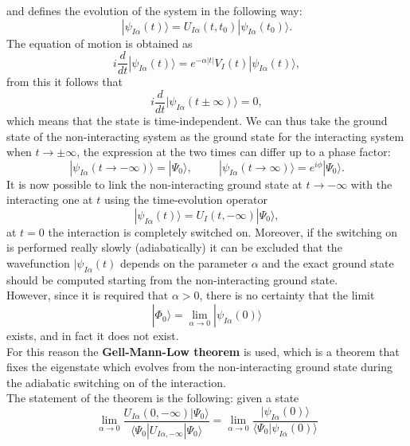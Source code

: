 \documentclass[12pt, a4paper]{report}
\numberwithin{equation}{section}
\begin{document}
and defines the evolution of the system in the following way:
\begin{equation}
    |\psi_{I\alpha}(t)\rangle=U_{I\alpha}(t,t_0)|\psi_{I\alpha}(t_0)\rangle.
\end{equation}
The equation of motion is obtained as
\begin{equation}
    i\frac{d}{dt}|\psi_{I\alpha}(t)\rangle = e^{-\alpha |t|} V_I(t)|\psi_{I\alpha}(t)\rangle,
\end{equation}
from this it follows that 
\begin{equation}
    i\frac{d}{dt}|\psi_{I\alpha}(t\pm\infty)\rangle = 0,
\end{equation}
which means that the state is time-independent. We can thus take the ground state of the non-interacting system as the ground state for the 
interacting system when $t\to\pm\infty$, the expression at the two times can differ up to a phase factor:
\begin{equation}
    |\psi_{I\alpha}(t\to-\infty)\rangle=|\Psi_0\rangle,\hspace{1cm}|\psi_{I\alpha}(t\to\infty)\rangle=e^{i\phi}|\Psi_0\rangle.
\end{equation}
It is now possible to link the non-interacting ground state at $t\to-\infty$ with the interacting one at $t$ using the time-evolution 
operator
\begin{equation}
    |\psi_{I\alpha}(t)\rangle=U_I(t,-\infty)|\Psi_0\rangle,
\end{equation}
at $t=0$ the interaction is completely switched on. Moreover, if the switching on is performed really slowly (adiabatically) it can be 
excluded that the wavefunction $|\psi_{I\alpha}(t)$ depends on the parameter $\alpha$ and the exact ground state should be computed starting from 
the non-interacting ground state.\\
However, since it is required that $\alpha>0$, there is no certainty that the limit
\begin{equation}
    |\Phi_0\rangle=\lim_{\alpha\to0}|\psi_{I\alpha}(0)\rangle
\end{equation}
exists, and in fact it does not exist.\\
For this reason the \textbf{Gell-Mann-Low theorem} \cite{PhysRev.84.350} is used, which is a theorem that fixes the eigenstate which evolves from the non-interacting 
ground state during the adiabatic switching on of the interaction.\\
The statement of the theorem is the following: given a state
\begin{equation}
    \lim_{\alpha\to 0}\frac{U_{I\alpha}(0,-\infty)|\Psi_0\rangle}{\langle\Psi_0|U_{I\alpha,-\infty}|\Psi_0\rangle}=\lim_{\alpha\to 0}\frac{|\psi_{I\alpha}(0)\rangle}{\langle\Psi_0|\psi_{I\alpha}(0)\rangle}
\end{equation}
\end{document}
